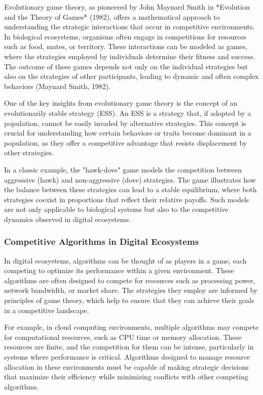 \documentclass[12pt,twoside]{article}
\begin{document}
Evolutionary game theory, as pioneered by John Maynard Smith in *Evolution and the Theory of Games* (1982), offers a mathematical approach to understanding the strategic interactions that occur in competitive environments. In biological ecosystems, organisms often engage in competitions for resources such as food, mates, or territory. These interactions can be modeled as games, where the strategies employed by individuals determine their fitness and success. The outcome of these games depends not only on the individual strategies but also on the strategies of other participants, leading to dynamic and often complex behaviors (Maynard Smith, 1982).

One of the key insights from evolutionary game theory is the concept of an evolutionarily stable strategy (ESS). An ESS is a strategy that, if adopted by a population, cannot be easily invaded by alternative strategies. This concept is crucial for understanding how certain behaviors or traits become dominant in a population, as they offer a competitive advantage that resists displacement by other strategies.

In a classic example, the "hawk-dove" game models the competition between aggressive (hawk) and non-aggressive (dove) strategies. The game illustrates how the balance between these strategies can lead to a stable equilibrium, where both strategies coexist in proportions that reflect their relative payoffs. Such models are not only applicable to biological systems but also to the competitive dynamics observed in digital ecosystems.

\subsubsection{Competitive Algorithms in Digital Ecosystems}

In digital ecosystems, algorithms can be thought of as players in a game, each competing to optimize its performance within a given environment. These algorithms are often designed to compete for resources such as processing power, network bandwidth, or market share. The strategies they employ are informed by principles of game theory, which help to ensure that they can achieve their goals in a competitive landscape.

For example, in cloud computing environments, multiple algorithms may compete for computational resources, such as CPU time or memory allocation. These resources are finite, and the competition for them can be intense, particularly in systems where performance is critical. Algorithms designed to manage resource allocation in these environments must be capable of making strategic decisions that maximize their efficiency while minimizing conflicts with other competing algorithms.
\end{document}
